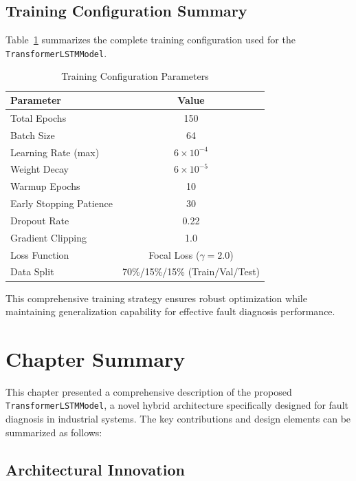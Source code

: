 \subsection{Training Configuration Summary}
\label{subsec:training_summary}

Table~\ref{tab:training_config} summarizes the complete training configuration used for the \texttt{TransformerLSTMModel}.

\begin{table}[h]
\centering
\caption{Training Configuration Parameters}
\label{tab:training_config}
\begin{tabular}{|l|c|}
\hline
\textbf{Parameter} & \textbf{Value} \\
\hline
Total Epochs & 150 \\
Batch Size & 64 \\
Learning Rate (max) & $6 \times 10^{-4}$ \\
Weight Decay & $6 \times 10^{-5}$ \\
Warmup Epochs & 10 \\
Early Stopping Patience & 30 \\
Dropout Rate & 0.22 \\
Gradient Clipping & 1.0 \\
Loss Function & Focal Loss ($\gamma=2.0$) \citep{lin2017focal} \\
Data Split & 70\%/15\%/15\% (Train/Val/Test) \\
\hline
\end{tabular}
\end{table}

This comprehensive training strategy ensures robust optimization while maintaining generalization capability for effective fault diagnosis performance.

\section{Chapter Summary}
\label{sec:hybrid_model:summary}

This chapter presented a comprehensive description of the proposed \texttt{TransformerLSTMModel}, a novel hybrid architecture specifically designed for fault diagnosis in industrial systems. The key contributions and design elements can be summarized as follows:

\subsection{Architectural Innovation}
\label{subsec:architectural_innovation}

